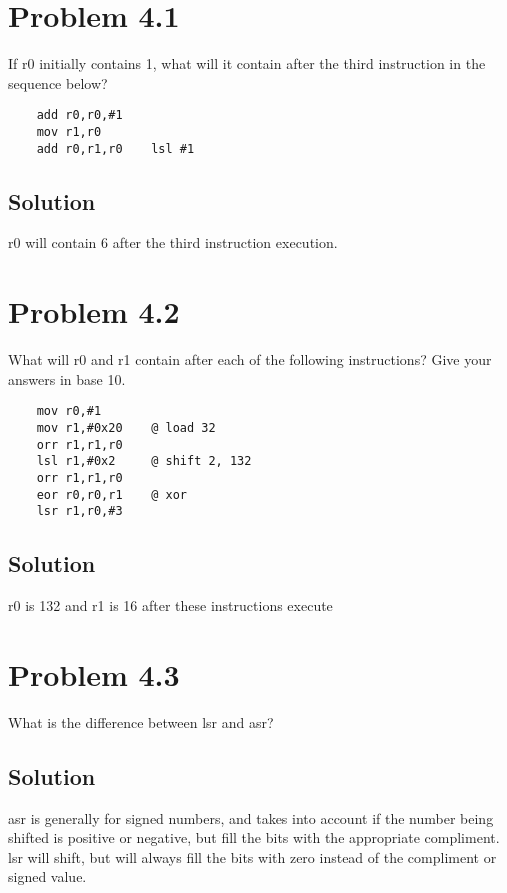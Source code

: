 \documentclass[letterpaper,11pt]{texMemo} %
\begin{document}
\maketitle %


\section*{Problem 4.1}
If r0 initially contains 1, what will it contain after the third instruction in the sequence below?

\begin{lstlisting}
    add r0,r0,#1
    mov r1,r0
    add r0,r1,r0    lsl #1
\end{lstlisting}
\subsection*{Solution}
r0 will contain 6 after the third instruction execution.

\section*{Problem 4.2}
What will r0 and r1 contain after each of the following instructions? Give your answers in base 10.
\begin{lstlisting}
    mov r0,#1
    mov r1,#0x20    @ load 32
    orr r1,r1,r0
    lsl r1,#0x2     @ shift 2, 132
    orr r1,r1,r0
    eor r0,r0,r1    @ xor
    lsr r1,r0,#3
\end{lstlisting}
\subsection*{Solution}
r0 is 132 and r1 is 16 after these instructions execute

\newpage

\section*{Problem 4.3}
What is the difference between lsr and asr?
\subsection*{Solution}
asr is generally for signed numbers, and takes into account if the number being shifted is positive or
negative, but fill the bits with the appropriate compliment. lsr will shift, but will always fill the 
bits with zero instead of the compliment or signed value.
\end{document}
